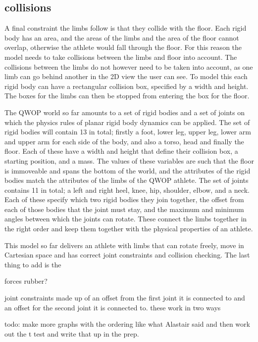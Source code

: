 \documentclass[12pt,a4paper,twoside,openright]{report}
\begin{document}
\subsection{collisions}
\label{sub:collisions}
A final constraint the limbs follow is that they collide with the floor.
Each rigid body has an area, and the areas of the limbs and the area of the floor cannot overlap, otherwise the athlete would fall through the floor.
For this reason the model needs to take collisions between the limbs and floor into account. The collisions between the limbs do not however need to be taken into account, as one limb can go behind another in the 2D view the user can see.
To model this each rigid body can have a rectangular collision box, specified by a width and height. The boxes for the limbs can then be stopped from entering the box for the floor.

The QWOP world so far amounts to a set of rigid bodies and a set of joints on which the physics rules of planar rigid body dynamics can be applied.
The set of rigid bodies will contain 13 in total; firstly a foot, lower leg, upper leg, lower arm and upper arm for each side of the body, and also a torso, head and finally the floor. Each of these have a width and height that define their collision box, a starting position, and a mass.
The values of these variables are such that the floor is immoveable and spans the bottom of the world, and the attributes of the rigid bodies match the attributes of the limbs of the QWOP athlete.
The set of joints contains 11 in total; a left and right heel, knee, hip, shoulder, elbow, and a neck. Each of these specify which two rigid bodies they join together, the offset from each of those bodies that the joint must stay, and the maximum and minimum angles between which the joints can rotate. These connect the limbs together in the right order and keep them together with the physical properties of an athlete.


This model so far delivers an athlete with limbs that can rotate freely, move in Cartesian space and has correct joint constraints and collision checking. The last thing to add is the 

forces
rubber?

joint constraints made up of an offset from the first joint it is connected to and an offset for the second joint it is connected to.
	these work in two ways


todo: make more graphs with the ordering like what Alastair said and then work out the t test and write that up in the prep.
\end{document}
